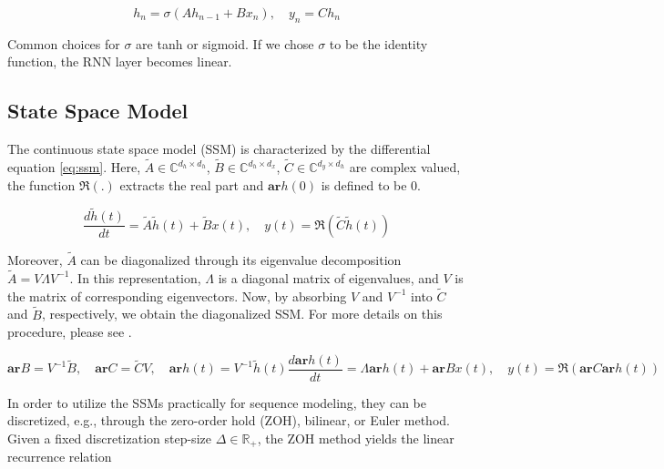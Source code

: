 \begin{equation}\label{eq:rnn}
h_n = \sigma(A h_{n-1} + B x_n), \quad y_n = C h_n
\end{equation}

Common choices for $\sigma$ are tanh or sigmoid. If we chose $\sigma$ to be the identity function, the RNN layer becomes linear. 

\subsection{State Space Model} The continuous state space model (SSM) is characterized by the  differential equation \ref{eq:ssm}. Here, $\tilde{A} \in \mathbb{C}^{d_h \times d_h}$, $\tilde{B} \in \mathbb{C}^{d_h \times d_x}$, $\tilde{C} \in \mathbb{C}^{d_y \times d_h}$ are complex valued, the function $\Re(.)$ extracts the real part and $\mathbf{ar}{h}(0)$ is defined to be $0$.

\begin{equation}\label{eq:ssm}
\frac{d \tilde{h}(t)}{dt} = \tilde{A} \tilde{h}(t) + \tilde{B} x(t), \quad y(t) = \Re(\tilde{C} \tilde{h}(t))
\end{equation}

Moreover, \( \tilde{A} \) can be diagonalized through its eigenvalue decomposition \( \tilde{A} = V \Lambda V^{-1} \). In this representation, \( \Lambda \) is a diagonal matrix of eigenvalues, and \( V \) is the matrix of corresponding eigenvectors. Now, by absorbing \( V \) and \( V^{-1} \) into \( \tilde{C} \) and \( \tilde{B} \), respectively, we obtain the diagonalized SSM. For more details on this procedure, please see \cite{smith2023simplified}.

\begin{subequations}\label{eq:ssm_diag}
\begin{equation}
\mathbf{ar}{B} = V^{-1} \tilde{B}, \quad \mathbf{ar}{C} = \tilde{C} V, \quad \mathbf{ar}{h}(t) = V^{-1} \tilde{h}(t)
\end{equation}
\begin{equation}
\frac{d \mathbf{ar}{h}(t)}{dt} = \Lambda \mathbf{ar}{h}(t) + \mathbf{ar}{B} x(t), \quad y(t) = \Re(\mathbf{ar}{C} \mathbf{ar}{h}(t))
\end{equation}
\end{subequations}

In order to utilize the SSMs practically for sequence modeling, they can be discretized, e.g., through the zero-order hold (ZOH), bilinear, or Euler method. Given a fixed discretization step-size \( \Delta \in \mathbb{R_{+}} \), the ZOH method yields the linear recurrence relation

